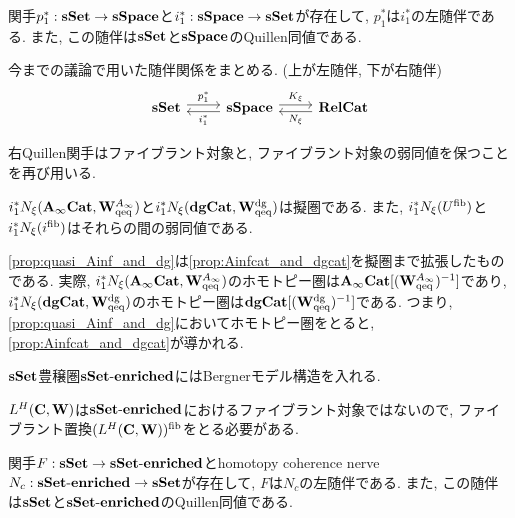 \documentclass[uplatex, a4paper, 14Q, dvipdfmx]{jsarticle}
\begin{document}
\begin{theorem}
  関手$p_1^\ast : \mathbf{sSet} \to \mathbf{sSpace}$と$i_1^\ast : \mathbf{sSpace} \to \mathbf{sSet}$が存在して, $p_1^\ast$は$i_1^\ast$の左随伴である.
  また, この随伴は$\mathbf{sSet}$と$\mathbf{sSpace}$のQuillen同値である. 
\end{theorem}

今までの議論で用いた随伴関係をまとめる. (上が左随伴, 下が右随伴)
\[\begin{tikzcd}
	\sset & \sspace & \relcat
	\arrow["{K_\xi}", shift left, from=1-2, to=1-3]
	\arrow["{p_1^\ast}", shift left, from=1-1, to=1-2]
	\arrow["{i_1^\ast}", shift left, from=1-2, to=1-1]
	\arrow["{N_\xi}", shift left, from=1-3, to=1-2]
\end{tikzcd}\]

右Quillen関手はファイブラント対象と, ファイブラント対象の弱同値を保つことを再び用いる.

\begin{corollary} \label{prop:quasi_Ainf_and_dg}
  $i_1^\ast N_\xi(\mathbf{A}_\infty\mathbf{Cat}, \mathbf{W}^{A_{\infty}}_\mathrm{qeq})$と$i_1^\ast N_\xi(\mathbf{dgCat}, \mathbf{W}^{\mathrm{dg}}_\mathrm{qeq})$は擬圏である.
  また, $i_1^\ast N_\xi(U^{\mathrm{fib}})$と$i_1^\ast N_\xi(i^{\mathrm{fib}})$はそれらの間の弱同値である.
\end{corollary}

\begin{remark}
  \cref{prop:quasi_Ainf_and_dg}は\cref{prop:Ainfcat_and_dgcat}を擬圏まで拡張したものである.
  実際, $i_1^\ast N_\xi(\mathbf{A}_\infty\mathbf{Cat}, \mathbf{W}^{A_{\infty}}_\mathrm{qeq})$のホモトピー圏は$\mathbf{A}_\infty\mathbf{Cat}[(\mathbf{W}^{A_{\infty}}_\mathrm{qeq})^{-1}]$であり, $i_1^\ast N_\xi(\mathbf{dgCat}, \mathbf{W}^{\mathrm{dg}}_\mathrm{qeq})$のホモトピー圏は$\mathbf{dgCat}[(\mathbf{W}^{\mathrm{dg}}_\mathrm{qeq})^{-1}]$である. 
  つまり, \cref{prop:quasi_Ainf_and_dg}においてホモトピー圏をとると, \cref{prop:Ainfcat_and_dgcat}が導かれる. 
\end{remark}

$\mathbf{sSet}$豊穣圏$\mathbf{sSet}\text{-}\mathbf{enriched}$にはBergnerモデル構造を入れる. 

$L^H(\mathbf{C},\mathbf{W})$は$\mathbf{sSet}\text{-}\mathbf{enriched}$におけるファイブラント対象ではないので, ファイブラント置換$(L^H(\mathbf{C},\mathbf{W}))^{\mathrm{fib}}$をとる必要がある.

\begin{theorem}
  関手$F : \mathbf{sSet} \to \mathbf{sSet}\text{-}\mathbf{enriched}$とhomotopy coherence nerve $N_c : \mathbf{sSet}\text{-}\mathbf{enriched} \to \mathbf{sSet}$が存在して, $F$は$N_c$の左随伴である.
  また, この随伴は$\mathbf{sSet}$と$\mathbf{sSet}\text{-}\mathbf{enriched}$のQuillen同値である. 
\end{theorem}
\end{document}
